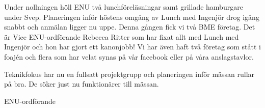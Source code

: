 \documentclass[../_main/handlingar.tex]{subfiles}
\begin{document}
Under nollningen höll ENU två lunchföreläsningar samt grillade hamburgare under Svep. Planeringen inför höstens omgång av Lunch med Ingenjör drog igång snabbt och anmälan ligger nu uppe. Denna gången fick vi två BME företag. Det är Vice ENU-ordförande Rebecca Ritter som har fixat allt med Lunch med Ingenjör och hon har gjort ett kanonjobb! Vi har även haft två företag som stått i foajén och flera som har velat synas på vår facebook eller på våra anslagstavlor.

Teknikfokus har nu en fullsatt projektgrupp och planeringen inför mässan rullar på bra. De söker just nu funktionärer till mässan.


\begin{signatures}{1}
    \mvh
    \signature{Josefine Sandström}{ENU-ordförande}
\end{signatures}
\end{document}
